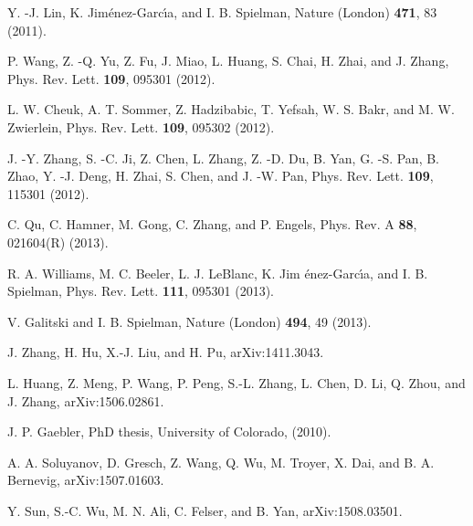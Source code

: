 \documentclass[prl,aps,twocolumn,showpacs,floatfix]{revtex4}
\begin{document}
\begin{thebibliography}{99}
 {Y. -J. Lin, K. Jim\'{e}nez-Garc\'{\i}a, and I. B.
Spielman, Nature (London) \textbf{471}, 83 (2011).}

 {P. Wang, Z. -Q. Yu, Z. Fu, J. Miao, L. Huang, S.
Chai, H. Zhai, and J. Zhang, Phys. Rev. Lett. \textbf{109}, 095301 (2012).}

 {L. W. Cheuk, A. T. Sommer, Z. Hadzibabic, T.
Yefsah, W. S. Bakr, and M. W. Zwierlein, Phys. Rev. Lett. \textbf{109},
095302 (2012).}

 {J. -Y. Zhang, S. -C. Ji, Z. Chen, L. Zhang, Z. -D.
Du, B. Yan, G. -S. Pan, B. Zhao, Y. -J. Deng, H. Zhai, S. Chen, and J. -W.
Pan, Phys. Rev. Lett. \textbf{109}, 115301 (2012).}

 {C. Qu, C. Hamner, M. Gong, C. Zhang, and P. Engels,
Phys. Rev. A \textbf{88}, 021604(R) (2013).}

 {R. A. Williams, M. C. Beeler, L. J. LeBlanc, K. Jim%
\'{e}nez-Garc\'{\i}a, and I. B. Spielman, Phys. Rev. Lett. \textbf{111},
095301 (2013).}

 {V. Galitski and I. B. Spielman, Nature (London)
\textbf{494}, 49 (2013).}

 {J. Zhang, H. Hu, X.-J. Liu, and H. Pu,
arXiv:1411.3043.}

 {L. Huang, Z. Meng, P. Wang, P. Peng, S.-L. Zhang,
L. Chen, D. Li, Q. Zhou, and J. Zhang, arXiv:1506.02861.}

 {J. P. Gaebler, PhD thesis, University of Colorado,
(2010).}

 {A. A. Soluyanov, D. Gresch, Z. Wang, Q. Wu, M. Troyer,
X. Dai, and B. A. Bernevig, arXiv:1507.01603.}

 {Y. Sun, S.-C. Wu, M. N. Ali, C. Felser, and B. Yan,
arXiv:1508.03501.}
\end{thebibliography}
\end{document}
